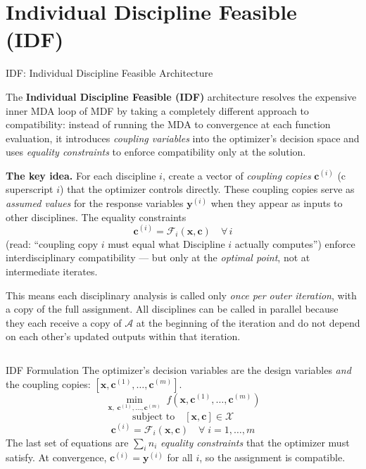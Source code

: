\documentclass[aspectratio=169,10pt]{beamer}
\begin{document}
\section{Individual Discipline Feasible (IDF)}

\begin{frame}[allowframebreaks]{IDF: Individual Discipline Feasible Architecture}

  The \textbf{Individual Discipline Feasible (IDF)} architecture resolves
  the expensive inner MDA loop of MDF by taking a completely different
  approach to compatibility: instead of running the MDA to convergence at
  each function evaluation, it introduces \emph{coupling variables} into
  the optimizer's decision space and uses \emph{equality constraints} to
  enforce compatibility only at the solution.

  \textbf{The key idea.}  For each discipline $i$, create a vector of
  \emph{coupling copies} $\mathbf{c}^{(i)}$ (c superscript $i$) that the
  optimizer controls directly.  These coupling copies serve as
  \emph{assumed values} for the response variables $\mathbf{y}^{(i)}$ when
  they appear as inputs to other disciplines.  The equality constraints
  \[
    \mathbf{c}^{(i)} = \mathcal{F}_i(\mathbf{x}, \mathbf{c})
    \quad \forall\, i
  \]
  (read: ``coupling copy $i$ must equal what Discipline $i$ actually
  computes'') enforce interdisciplinary compatibility --- but only at the
  \emph{optimal point}, not at intermediate iterates.

  This means each disciplinary analysis is called only \emph{once per
  outer iteration}, with a copy of the full assignment.  All disciplines
  can be called in parallel because they each receive a copy of $\mathcal{A}$
  at the beginning of the iteration and do not depend on each other's
  updated outputs within that iteration.

  \framebreak

  \begin{columns}[T]
    \begin{block}{IDF Formulation}
      The optimizer's decision variables are the design variables
      \emph{and} the coupling copies:
      $[\mathbf{x}, \mathbf{c}^{(1)}, \ldots, \mathbf{c}^{(m)}]$.
      \[
        \min_{\mathbf{x},\;\mathbf{c}^{(1)},\ldots,\mathbf{c}^{(m)}}\;
        f\!\left(\mathbf{x}, \mathbf{c}^{(1)}, \ldots, \mathbf{c}^{(m)}\right)
      \]
      \[
        \text{subject to}\quad
        \left[\mathbf{x}, \mathbf{c}\right] \in \mathcal{X}
      \]
      \[
        \mathbf{c}^{(i)} = \mathcal{F}_i\!\left(\mathbf{x}, \mathbf{c}\right)
        \quad \forall\; i = 1, \ldots, m
      \]
      The last set of equations are $\sum_i n_i$ \emph{equality constraints}
      that the optimizer must satisfy.  At convergence, $\mathbf{c}^{(i)}
      = \mathbf{y}^{(i)}$ for all $i$, so the assignment is compatible.
    \end{block}


\end{columns}
\end{frame}
\end{document}
